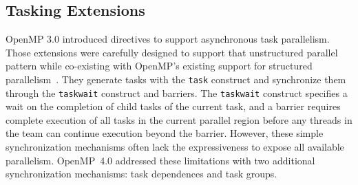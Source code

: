 \subsection{Tasking Extensions}
\label{sub:tasking}

OpenMP 3.0 introduced directives to support asynchronous task parallelism. 
Those extensions were carefully designed to support that unstructured 
parallel pattern while co-existing with OpenMP's existing support for 
structured parallelism~\cite{ayguade2009tpds}. They generate tasks with the 
\texttt{task} construct and synchronize them through the \texttt{taskwait} 
construct and barriers. The \texttt{taskwait} construct specifies a wait 
on the completion of child tasks of the current task, and a barrier requires 
complete execution of all tasks in the current parallel region before any 
threads in the team can continue execution beyond the barrier. However, these 
simple synchronization mechanisms often lack the expressiveness to expose all 
available parallelism. OpenMP~4.0 addressed these limitations with two 
additional synchronization mechanisms: task dependences and task groups.

